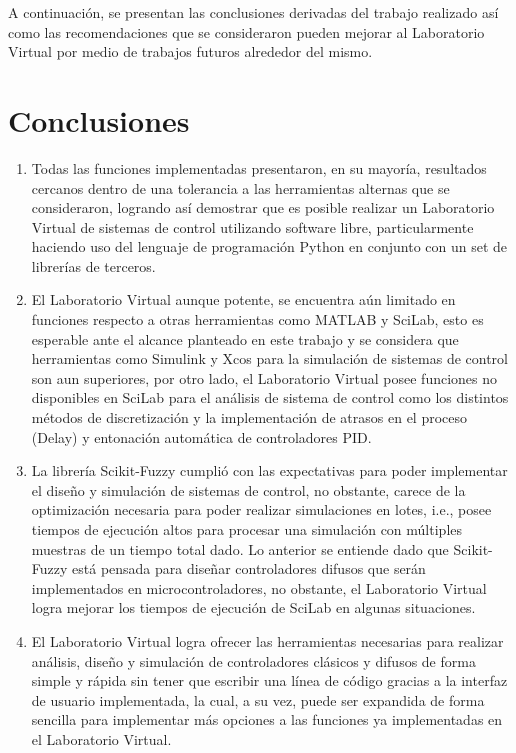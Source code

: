 A continuación, se presentan las conclusiones derivadas del trabajo realizado así como las recomendaciones que se consideraron pueden mejorar al Laboratorio Virtual por medio de trabajos futuros alrededor del mismo.

\section{Conclusiones}

    \begin{enumerate}[leftmargin=15pt]
        \setlength\itemsep{10pt}    
        \item Todas las funciones implementadas presentaron, en su mayoría, resultados cercanos dentro de una tolerancia a las herramientas alternas que se consideraron, logrando así demostrar que es posible realizar un Laboratorio Virtual de sistemas de control utilizando software libre, particularmente haciendo uso del lenguaje de programación Python en conjunto con un set de librerías de terceros.
        
        \item El Laboratorio Virtual aunque potente, se encuentra aún limitado en funciones respecto a otras herramientas como MATLAB y SciLab, esto es esperable ante el alcance planteado en este trabajo y se considera que herramientas como Simulink y Xcos para la simulación de sistemas de control son aun superiores, por otro lado, el Laboratorio Virtual posee funciones no disponibles en SciLab para el análisis de sistema de control como los distintos métodos de discretización y la implementación de atrasos en el proceso (Delay) y entonación automática de controladores PID.
        
        \item La librería Scikit-Fuzzy cumplió con las expectativas para poder implementar el diseño y simulación de sistemas de control, no obstante, carece de la optimización necesaria para poder realizar simulaciones en lotes, i.e., posee tiempos de ejecución altos para procesar una simulación con múltiples muestras de un tiempo total dado. Lo anterior se entiende dado que Scikit-Fuzzy está pensada para diseñar controladores difusos que serán implementados en microcontroladores, no obstante, el Laboratorio Virtual logra mejorar los tiempos de ejecución de SciLab en algunas situaciones.
        
        \item El Laboratorio Virtual logra ofrecer las herramientas necesarias para realizar análisis, diseño y simulación de controladores clásicos y difusos de forma simple y rápida sin tener que escribir una línea de código gracias a la interfaz de usuario implementada, la cual, a su vez, puede ser expandida de forma sencilla para implementar más opciones a las funciones ya implementadas en el Laboratorio Virtual.
        

\end{enumerate}
